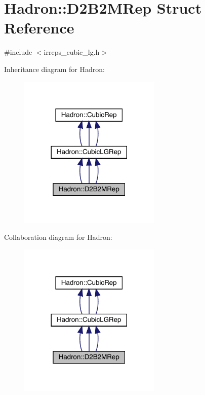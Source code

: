 \hypertarget{structHadron_1_1D2B2MRep}{}\section{Hadron\+:\+:D2\+B2\+M\+Rep Struct Reference}
\label{structHadron_1_1D2B2MRep}


{\ttfamily \#include $<$irreps\+\_\+cubic\+\_\+lg.\+h$>$}



Inheritance diagram for Hadron\+:
\nopagebreak
\begin{figure}[H]
\begin{center}
\leavevmode
\includegraphics[width=192pt]{dc/dff/structHadron_1_1D2B2MRep__inherit__graph}
\end{center}
\end{figure}


Collaboration diagram for Hadron\+:
\nopagebreak
\begin{figure}[H]
\begin{center}
\leavevmode
\includegraphics[width=192pt]{de/d6e/structHadron_1_1D2B2MRep__coll__graph}
\end{center}
\end{figure}

